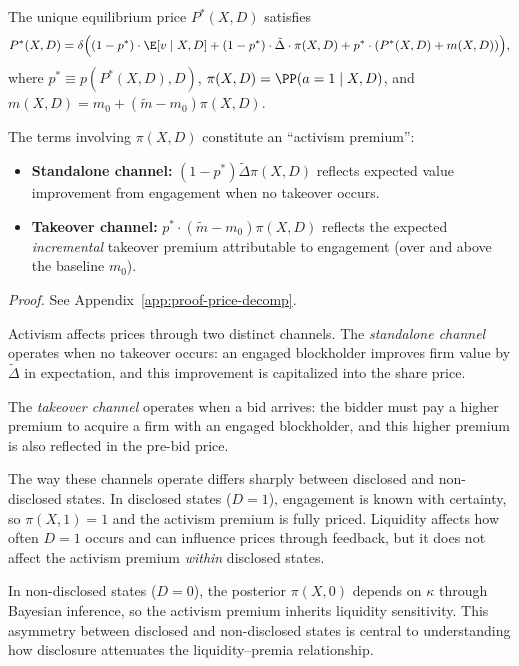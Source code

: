 \begin{proposition}
\label{prop:price-decomp}
The unique equilibrium price $P^*(X,D)$ satisfies
\[
P^*(X,D) = \delta\Big((1-p^*) \cdot \E[v \mid X,D] + (1-p^*) \cdot \tilde{\Delta} \cdot \pi(X,D) + p^* \cdot (P^*(X,D) + m(X,D))\Big),
\]
where $p^* \equiv p(P^*(X,D),D)$, $\pi(X,D) = \PP(a=1 \mid X,D)$, and $m(X,D) = m_0 + (\tilde{m} - m_0)\pi(X,D)$.

The terms involving $\pi(X,D)$ constitute an ``activism premium'':
\begin{itemize}[leftmargin=1.5em,itemsep=0pt]
\item \textbf{Standalone channel:} $(1-p^*)\tilde{\Delta}\pi(X,D)$ reflects expected value improvement from engagement when no takeover occurs.
\item \textbf{Takeover channel:} $p^* \cdot (\tilde{m}-m_0)\pi(X,D)$ reflects the expected \emph{incremental} takeover premium attributable to engagement (over and above the baseline $m_0$).
\end{itemize}
\end{proposition}
\textit{Proof.} See Appendix~\ref{app:proof-price-decomp}.

Activism affects prices through two distinct channels. The \emph{standalone channel} operates when no takeover occurs: an engaged blockholder improves firm value by $\tilde{\Delta}$ in expectation, and this improvement is capitalized into the share price.

The \emph{takeover channel} operates when a bid arrives: the bidder must pay a higher premium to acquire a firm with an engaged blockholder, and this higher premium is also reflected in the pre-bid price.

The way these channels operate differs sharply between disclosed and non-disclosed states. In disclosed states ($D=1$), engagement is known with certainty, so $\pi(X,1)=1$ and the activism premium is fully priced. Liquidity affects how often $D=1$ occurs and can influence prices through feedback, but it does not affect the activism premium \emph{within} disclosed states.

In non-disclosed states ($D=0$), the posterior $\pi(X,0)$ depends on $\kappa$ through Bayesian inference, so the activism premium inherits liquidity sensitivity. This asymmetry between disclosed and non-disclosed states is central to understanding how disclosure attenuates the liquidity--premia relationship.

